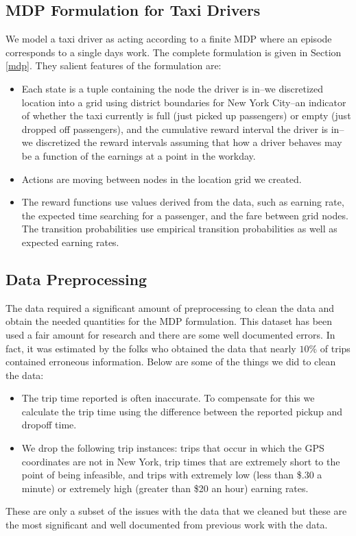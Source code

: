 \documentclass{article}
\begin{document}
\subsection{MDP Formulation for Taxi Drivers}
We model a taxi driver as acting according to a finite MDP where an episode corresponds to a single days work. The complete formulation is given in Section \ref{mdp}. They salient features of the formulation are:
\begin{itemize}
\item Each state is a tuple containing the node the driver is in--we discretized location into a grid using district boundaries for New York City--an indicator of whether the taxi currently is full (just picked up passengers) or empty (just dropped off passengers), and the cumulative reward interval the driver is in--we discretized the reward intervals assuming that how a driver behaves may be a function of the earnings at a point in the workday.
\item Actions are moving between nodes in the location grid we created.
\item The reward functions use values derived from the data, such as earning rate, the expected time searching for a passenger, and the fare between grid nodes. The transition probabilities use empirical transition probabilities as well as expected earning rates. 
\end{itemize}
\subsection{Data Preprocessing}
The data required a significant amount of preprocessing to clean the data and obtain the needed quantities for the MDP formulation. This dataset has been used a fair amount for research and there are some well documented errors. In fact, it was estimated by the folks who obtained the data that nearly $10\%$ of trips contained erroneous information. Below are some of the things we did to clean the data:
\begin{itemize}
\item The trip time reported is often inaccurate. To compensate for this we calculate the trip time using the difference between the reported pickup and dropoff time.
\item We drop the following trip instances: trips that occur in which the GPS coordinates are not in New York, trip times that are extremely short to the point of being infeasible, and trips with extremely low (less than \$.30 a minute) or extremely high (greater than \$20 an hour) earning rates.
\end{itemize}
These are only a subset of the issues with the data that we cleaned but these are the most significant and well documented from previous work with the data. 
\end{document}
